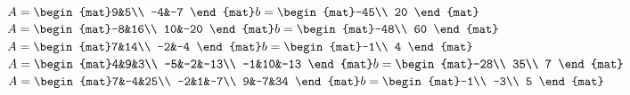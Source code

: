 \begin{Exercise}[
name={},
title={}, 
difficulty=0,
origin={\cite{GH}}]
\begin{multicols}{2}
\Question $A=\begin{mat}9&5\\  -4&-7 \end{mat}\\ b=\begin{mat}-45\\  20 \end{mat}$
\Question $A=\begin{mat}-8&16\\  10&-20 \end{mat}\\ b=\begin{mat}-48\\  60 \end{mat}$
\Question $A=\begin{mat}7&14\\  -2&-4 \end{mat}\\ b=\begin{mat}-1\\  4 \end{mat}$
\Question $A=\begin{mat}4&9&3\\  -5&-2&-13\\  -1&10&-13 \end{mat}\\ b=\begin{mat}-28\\  35\\  7 \end{mat}$
\Question $A=\begin{mat}7&-4&25\\  -2&1&-7\\  9&-7&34 \end{mat}\\ b=\begin{mat}-1\\  -3\\  5 \end{mat}$
\EndCurrentQuestion
\end{multicols}
\end{Exercise}

